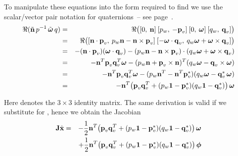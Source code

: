 To manipulate these equations into the form required to find  we use the scalar/vector
pair notation for quaternions~-- see page~\pageref{quatProduct2}.
\begin{eqnarray*}
\Re(\tilde{\ve{n}}\, \q{p}^{-1}\, \tilde{\ve{\omega}}\,\q{q}) & = &
    \Re\big( [0,\:\ve{n}]\: [p_w,\:-\ve{p}_v]\: [0,\:\ve{\omega}]\: [q_w,\:\ve{q}_v] \big) \\*
&=& \Re\big( [\ve{n}\cdot\ve{p}_v,\: p_w\ve{n} - \ve{n}\times\ve{p}_v]\:
             [-\ve{\omega}\cdot\ve{q}_v,\: q_w\ve{\omega} + \ve{\omega}\times\ve{q}_v] \big) \\*
&=& -(\ve{n}\cdot\ve{p}_v) (\ve{\omega}\cdot\ve{q}_v) -
    ( p_w\ve{n} - \ve{n}\times\ve{p}_v ) \cdot ( q_w\ve{\omega} + \ve{\omega}\times\ve{q}_v ) \\*
&=& -\ve{n}^T \ve{p}_v \ve{q}_v^T \ve{\omega} - ( p_w\ve{n} + \ve{p}_v\times\ve{n} )^T
    ( q_w\ve{\omega} - \ve{q}_v\times\ve{\omega} ) \\*
&=& -\ve{n}^T \ve{p}_v \ve{q}_v^T \ve{\omega} - ( p_w\ve{n}^T - \ve{n}^T\dual{\ve{p}_v} )
    ( q_w\ve{\omega} - \dual{\ve{q}_v}\,\ve{\omega} ) \\*
&=& -\ve{n}^T \big( \ve{p}_v \ve{q}_v^T + ( p_w\m{1} - \dual{\ve{p}_v} )
    ( q_w\m{1} - \dual{\ve{q}_v} ) \big)\, \ve{\omega}
\end{eqnarray*}

Here  denotes the $3\times3$ identity matrix. The same derivation is valid if we substitute
\ve{\phi} for \ve{\omega}, hence we obtain the Jacobian
\begin{eqnarray}
\m{J}\dot{\ve{x}} & = & 
    -\frac{1}{2} \ve{n}^T \big( \ve{p}_v \ve{q}_v^T + ( p_w\m{1} - \dual{\ve{p}_v} )
    ( q_w\m{1} - \dual{\ve{q}_v} ) \big)\, \ve{\omega} \nonumber\\*
&&  +\frac{1}{2} \ve{n}^T \big( \ve{p}_v \ve{q}_v^T + ( p_w\m{1} - \dual{\ve{p}_v} )
    ( q_w\m{1} - \dual{\ve{q}_v} ) \big)\, \ve{\phi}
\end{eqnarray}

